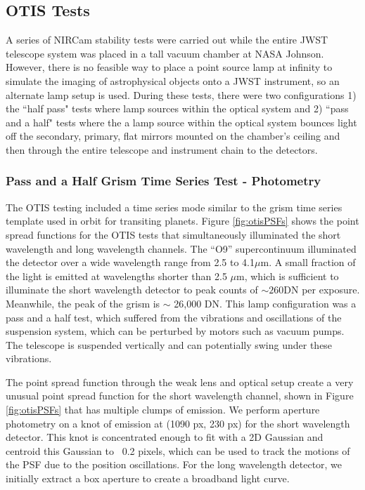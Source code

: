 \documentclass{aastex62}
\begin{document}
\clearpage
\subsection{OTIS Tests}

A series of NIRCam stability tests were carried out while the entire JWST telescope system was placed in a tall vacuum chamber at NASA Johnson.
However, there is no feasible way to place a point source lamp at infinity to simulate the imaging of astrophysical objects onto a JWST instrument, so an alternate lamp setup is used.
During these tests, there were two configurations 1) the ``half pass" tests where lamp sources within the optical system and 2) ``pass and a half" tests where the a lamp source within the optical system bounces light off the secondary, primary, flat mirrors mounted on the chamber's ceiling and then through the entire telescope and instrument chain to the detectors.

\subsubsection{Pass and a Half Grism Time Series Test - Photometry}
The OTIS testing included a time series mode similar to the grism time series template used in orbit for transiting planets.
Figure \ref{fig:otisPSFs} shows the point spread functions for the OTIS tests that simultaneously illuminated the short wavelength and long wavelength channels.
The ``O9'' supercontinuum illuminated the detector over a wide wavelength range from 2.5 to 4.1$\mu$m.
A small fraction of the light is emitted at wavelengths shorter than 2.5 $\mu$m, which is sufficient to illuminate the short wavelength detector to peak counts of $\sim 260$DN per exposure.
Meanwhile, the peak of the grism is $\sim$ 26,000 DN.
This lamp configuration was a pass and a half test, which suffered from the vibrations and oscillations of the suspension system, which can be perturbed by motors such as vacuum pumps.
The telescope is suspended vertically and can potentially swing under these vibrations.

The point spread function through the weak lens and optical setup create a very unusual point spread function for the short wavelength channel, shown in Figure \ref{fig:otisPSFs} that has multiple clumps of emission.
We perform aperture photometry on a knot of emission at (1090 px, 230 px) for the short wavelength detector.
This knot is concentrated enough to fit with a 2D Gaussian and centroid this Gaussian to ~0.2 pixels, which can be used to track the motions of the PSF due to the position oscillations.
For the long wavelength detector, we initially extract a box aperture to create a broadband light curve.
\end{document}
